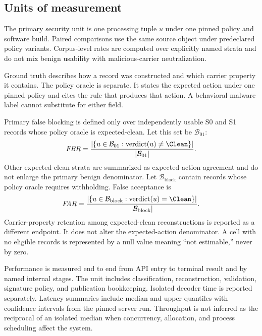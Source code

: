 \subsection{Units of measurement}

The primary security unit is one processing tuple $u$ under one pinned policy
and software build. Paired comparisons use the same source object under
predeclared policy variants. Corpus-level rates are computed over explicitly
named strata and do not mix benign usability with malicious-carrier
neutralization.

Ground truth describes how a record was constructed and which carrier property
it contains. The policy oracle is separate. It states the expected action under
one pinned policy and cites the rule that produces that action. A behavioral
malware label cannot substitute for either field.

Primary false blocking is defined only over independently usable S0 and S1
records whose policy oracle is expected-clean. Let this set be $\mathcal{B}_{01}$:
\begin{equation}
  \mathit{FBR} =
  \frac{|\{u\in\mathcal{B}_{01}:\operatorname{verdict}(u)\neq\Clean\}|}
       {|\mathcal{B}_{01}|}.
  \label{eq:term-false-blocking}
\end{equation}
Other expected-clean strata are summarized as expected-action agreement and do
not enlarge the primary benign denominator. Let $\mathcal{B}_{\mathrm{block}}$
contain records whose policy oracle requires withholding. False acceptance is
\begin{equation}
  \mathit{FAR} =
  \frac{|\{u\in\mathcal{B}_{\mathrm{block}}:
    \operatorname{verdict}(u)=\Clean\}|}
       {|\mathcal{B}_{\mathrm{block}}|}.
  \label{eq:term-false-acceptance}
\end{equation}
Carrier-property retention among expected-clean reconstructions is reported as
a different endpoint. It does not alter the expected-action denominator. A
cell with no eligible records is represented by a null value meaning ``not
estimable,'' never by zero.

Performance is measured end to end from API entry to terminal result and by
named internal stages. The unit includes classification, reconstruction,
validation, signature policy, and publication bookkeeping. Isolated decoder
time is reported separately. Latency summaries include median and upper
quantiles with confidence intervals from the pinned server run. Throughput is
not inferred as the reciprocal of an isolated median when concurrency,
allocation, and process scheduling affect the system.

